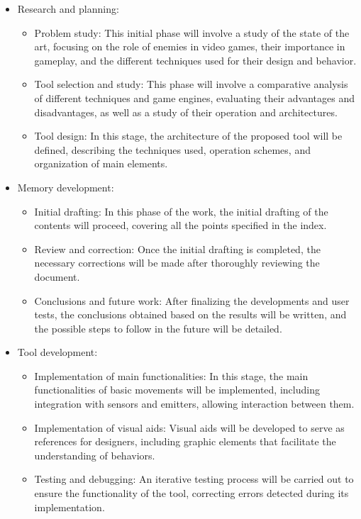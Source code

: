 \begin{itemize}
    \item  Research and planning:
	\begin{itemize}
	    \item  Problem study: This initial phase will involve a study of the state of the art, focusing on the role of enemies in video games, their importance in gameplay, and the different techniques used for their design and behavior.
	    \item Tool selection and study: This phase will involve a comparative analysis of different techniques and game engines, evaluating their advantages and disadvantages, as well as a study of their operation and architectures.
	    \item Tool design: In this stage, the architecture of the proposed tool will be defined, describing the techniques used, operation schemes, and organization of main elements.
	\end{itemize}
  \item Memory development:
	\begin{itemize}
	    \item  Initial drafting: In this phase of the work, the initial drafting of the contents will proceed, covering all the points specified in the index.
	    \item Review and correction: Once the initial drafting is completed, the necessary corrections will be made after thoroughly reviewing the document.
	    \item Conclusions and future work: After finalizing the developments and user tests, the conclusions obtained based on the results will be written, and the possible steps to follow in the future will be detailed.
	\end{itemize}
    \item Tool development:
	\begin{itemize}
	    \item  Implementation of main functionalities: In this stage, the main functionalities of basic movements will be implemented, including integration with sensors and emitters, allowing interaction between them.
	    \item Implementation of visual aids: Visual aids will be developed to serve as references for designers, including graphic elements that facilitate the understanding of behaviors.
	    \item Testing and debugging: An iterative testing process will be carried out to ensure the functionality of the tool, correcting errors detected during its implementation.

\end{itemize}
\end{itemize}
